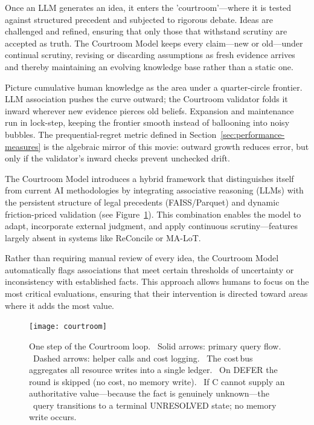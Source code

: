\documentclass[11pt]{article}
\begin{document}
Once an LLM generates an idea, it enters the 'courtroom'—where it is tested against structured precedent and subjected to rigorous debate. Ideas are challenged and refined, ensuring that only those that withstand scrutiny are accepted as truth. The Courtroom Model keeps every claim—new or old—under continual scrutiny, revising or discarding assumptions as fresh evidence arrives and thereby maintaining an evolving knowledge base rather than a static one.

Picture cumulative human knowledge as the area under a quarter-circle frontier. LLM association pushes the curve outward; the Courtroom validator folds it inward wherever new evidence pierces old beliefs. Expansion and maintenance run in lock-step, keeping the frontier smooth instead of ballooning into noisy bubbles. The prequential-regret metric defined in Section~\ref{sec:performance-measures} is the algebraic mirror of this movie: outward growth reduces error, but only if the validator's inward checks prevent unchecked drift.

The Courtroom Model introduces a hybrid framework that distinguishes itself from current AI methodologies by integrating associative reasoning (LLMs) with the persistent structure of legal precedents (FAISS/Parquet) and dynamic friction-priced validation (see Figure~\ref{fig:courtroom}).
This combination enables the model to adapt, incorporate external judgment, and apply continuous scrutiny—features largely absent in systems like ReConcile or MA-LoT.

Rather than requiring manual review of every idea, the Courtroom Model automatically flags associations that meet certain thresholds of uncertainty or inconsistency with established facts. This approach allows humans to focus on the most critical evaluations, ensuring that their intervention is directed toward areas where it adds the most value.

\begin{figure}[H]
  \centering
  \texttt{[image: courtroom]}%
  \caption{One step of the Courtroom loop.%
           \ Solid arrows: primary query flow.%
           \ Dashed arrows: helper calls and cost logging.%
           \ The cost\,bus aggregates all resource writes into a single ledger.
           \ On \textsc{DEFER} the round is skipped (no cost, no memory write).
           \ If C cannot supply an authoritative value—because the fact is genuinely unknown—the 
           \ query transitions to a terminal UNRESOLVED state; no memory write occurs.}
  \label{fig:courtroom}
\end{figure}
\end{document}
